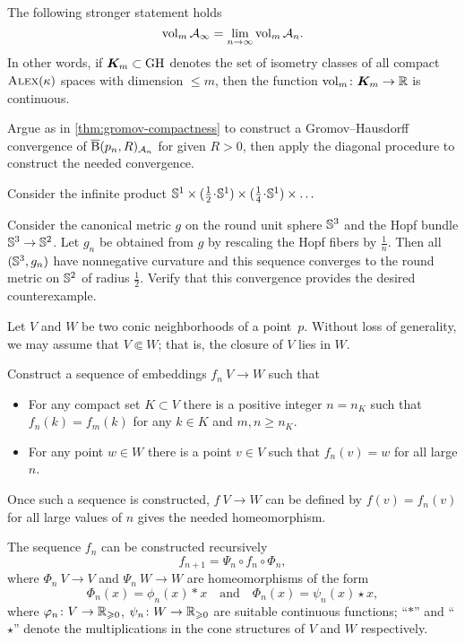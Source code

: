 The following stronger statement holds
\[\operatorname{\rm vol}\nolimits_m\mathcal{A}_\infty=\lim_{n\to\infty} \operatorname{\rm vol}\nolimits_m\mathcal{A}_n.\]
In other words, if $\bm{K}_m\subset \operatorname{\rm GH}\nolimits$ denotes the set of isometry classes of all compact $\textsc{Alex}(\kappa)$ spaces with dimension $\le m$, then the function
$\operatorname{\rm vol}\nolimits_m\colon\bm{K}_m\to \mathbb{R}$ is continuous.


Argue as in \ref{thm:gromov-compactness} to construct a Gromov--Hausdorff convergence of $\overline{\mathrm{B}}{}(p_n,R)_{\mathcal{A}_n}$ for given $R>0$, then apply the diagonal procedure to construct the needed convergence.

Consider the infinite product $\SSS^1\times ({\tfrac 12}\cdot \SSS^1)\times ({\tfrac 14}\cdot \SSS^1)\times\dots$

Consider the canonical metric $g$ on the round unit sphere $\mathbb{S}^3$ and the Hopf bundle $\mathbb{S}^3\to \mathbb{S}^2$.
Let $g_n$ be obtained from $g$ by rescaling the Hopf fibers by $\frac{1}{n}$.
Then all  $(\mathbb{S}^3,g_n)$ have nonnegative curvature and this sequence converges to the round metric on $\mathbb{S}^2$ of radius $\frac{1}{2}$.
Verify that this convergence provides the desired counterexample.



Let $V$ and $W$ be two conic neighborhoods of a point~$p$.
Without loss of generality, we may assume that $V\Subset W$;
that is, the closure of $V$ lies in $W$.

Construct a sequence of embeddings $f_n\:V\to W$
such that 
\begin{itemize}
\item 
For any compact set $K\subset V$ 
there is a positive integer $n=n_K$ such that 
$f_n(k)=f_m(k)$ for any $k\in K$ and $m, n \ge n_K$.
\item For any point $w\in W$ there is a point $v\in V$ such that $f_n(v)=w$ for all large $n$.
\end{itemize}

Once such a sequence is constructed, $f\:V\to W$ can be defined by $f(v)=f_n(v)$ for all large values of $n$ gives the needed homeomorphism.

The sequence $f_n$ can be constructed recursively
\[f_{n+1}=\Psi_n\circ f_n\circ \Phi_n,\]
where $\Phi_n\:V\to V$ 
and $\Psi_n\:W\to W$ 
are homeomorphisms
of the form 
\[\Phi_n(x)=\phi_n(x)\ast x\quad \text{and}\quad \Phi_n(x)=\psi_n(x)\star x,\]
where $\varphi_n\colon V\to \mathbb{R}_{\geqslant 0}$, $\psi_n\colon W\to \mathbb{R}_{\geqslant 0}$ are suitable continuous functions;
``$\ast$'' and ``$\star$'' denote the multiplications in the cone structures of $V$ and $W$ respectively.


